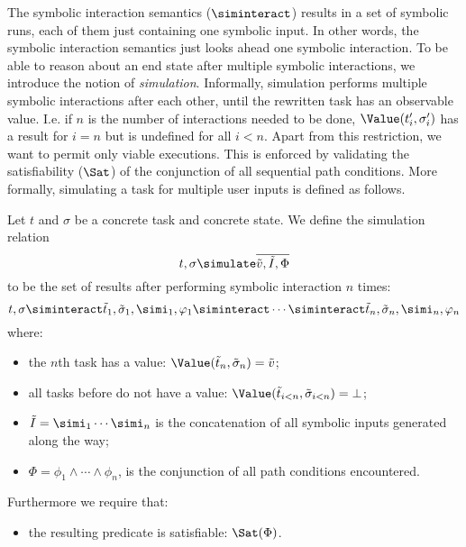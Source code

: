The symbolic interaction semantics ($\siminteract$) results in a set of symbolic runs, each of them just containing one symbolic input.
In other words, the symbolic interaction semantics just looks ahead one symbolic interaction.
To be able to reason about an end state after multiple symbolic interactions,
we introduce the notion of \emph{simulation}.
Informally, simulation performs multiple symbolic interactions after each other,
until the rewritten task has an observable value.
I.e. if $n$ is the number of interactions needed to be done,
$\Value(t_i', \sigma_i')$ has a result for $i = n$ but is undefined for all $i < n$.
Apart from this restriction, we want to permit only viable executions.
This is enforced by validating the satisfiability ($\Sat$) of the conjunction of all sequential path conditions.
More formally, simulating a task for multiple user inputs is defined as follows.

\begin{definition}[Simulation]
  \label{def:simulation}
  Let $t$ and $\sigma$ be a concrete task and concrete state.
  We define the simulation relation
  \begin{equation*}
    t,\sigma \simulate \overline{\tilde{v},\tilde{I},\Phi}
  \end{equation*}
  to be the set of results after performing symbolic interaction $n$ times:
  \begin{equation*}
      t,\sigma
        \siminteract \tilde{t}_1,\tilde{\sigma}_1,\simi_1,\phi_1
        \siminteract \cdots
        \siminteract \tilde{t}_n,\tilde{\sigma}_n,\simi_n,\phi_n
  \end{equation*}
  where:
  \begin{itemize}
    \item the $n$th task has a value: $\Value(\tilde{t}_n,\tilde{\sigma}_n) = \tilde{v}$;
    \item all tasks before do not have a value: $\Value(\tilde{t}_{i<n},\tilde{\sigma}_{i<n}) = \bot$;
    \item $\tilde{I} = \simi_1 \cdots \simi_n$ is the concatenation of all symbolic inputs generated along the way;
    \item $\Phi = \phi_1 \land \cdots \land \phi_n$, is the conjunction of all path conditions encountered.
  \end{itemize}
  Furthermore we require that:
  \begin{itemize}
    \item the resulting predicate is satisfiable: $\Sat(\Phi)$.
  \end{itemize}
\end{definition}

